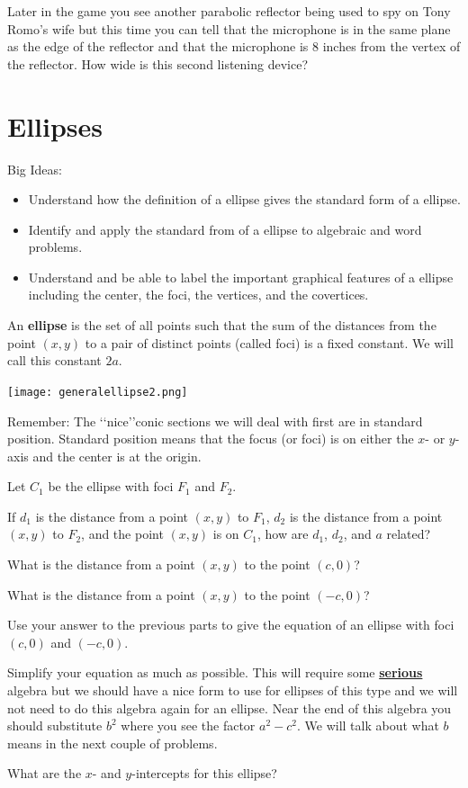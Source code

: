 \question Later in the game you see another parabolic reflector being used to spy on Tony Romo's wife but this time you can tell that the microphone is in the same plane as the edge of the reflector and that the microphone is 8 inches from the vertex of the reflector. How wide is this second listening device?

\section{Ellipses}
Big Ideas:
\begin{itemize}
\item Understand how the definition of a ellipse gives the standard form of a ellipse.
\item Identify and apply the standard from of a ellipse to algebraic and word problems.
\item Understand and be able to label the important graphical features of a ellipse including the center, the foci, the vertices, and the covertices.
\end{itemize}
\begin{info} An \textbf{ellipse} is the set of all points such that the sum of the distances from the point $(x,y)$ to a pair of distinct points (called foci) is a fixed constant. We will call this constant $2a$.
\end{info}
\begin{center} \texttt{[image: generalellipse2.png]} \end{center}

Remember:  The \lq\lq nice\rq\rq conic sections we will deal with first are in standard position. Standard position means that the focus (or foci) is on either the $x$- or $y$-axis and the center is at the origin.

\bq Let $C_1$ be the ellipse with foci $F_1$ and $F_2$.
\be
\item If $d_1$ is the distance from a point $(x,y)$ to $F_1$, $d_2$ is the distance from a point $(x,y)$ to $F_2$, and the point $(x,y)$ is on $C_1$, how are $d_1$, $d_2$, and $a$ related?
\item What is the distance from a point $(x,y)$ to the point $(c,0)$?
\item What is the distance from a point $(x,y)$ to the point $(-c,0)$?
\item Use your answer to the previous parts to give the equation of an ellipse with foci $(c,0)$ and $(-c,0)$.
\item Simplify your equation as much as possible. This will require some \textbf{\underline{serious}} algebra but we should have a nice form to use for ellipses of this type and we will not need to do this algebra again for an ellipse. Near the end of this algebra you should substitute $b^2$ where you see the factor $a^2-c^2$. We will talk about what $b$ means in the next couple of problems.
\item What are the $x$- and $y$-intercepts for this ellipse?
\ee \eq

